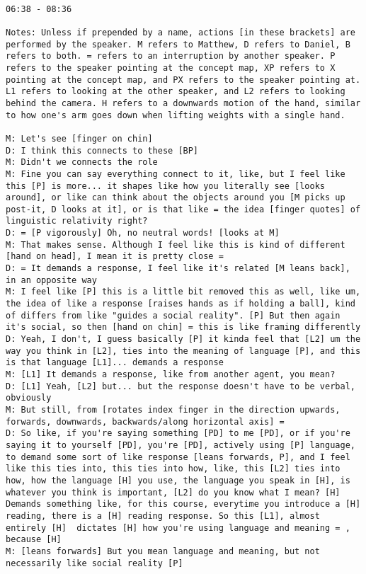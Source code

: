 \documentclass[12pt]{article}
\begin{document}
\begin{lstlisting}

06:38 - 08:36

Notes: Unless if prepended by a name, actions [in these brackets] are performed by the speaker. M refers to Matthew, D refers to Daniel, B refers to both. = refers to an interruption by another speaker. P refers to the speaker pointing at the concept map, XP refers to X pointing at the concept map, and PX refers to the speaker pointing at. L1 refers to looking at the other speaker, and L2 refers to looking behind the camera. H refers to a downwards motion of the hand, similar to how one's arm goes down when lifting weights with a single hand.

M: Let's see [finger on chin]
D: I think this connects to these [BP]
M: Didn't we connects the role
M: Fine you can say everything connect to it, like, but I feel like this [P] is more... it shapes like how you literally see [looks around], or like can think about the objects around you [M picks up post-it, D looks at it], or is that like = the idea [finger quotes] of linguistic relativity right?
D: = [P vigorously] Oh, no neutral words! [looks at M]
M: That makes sense. Although I feel like this is kind of different [hand on head], I mean it is pretty close =
D: = It demands a response, I feel like it's related [M leans back], in an opposite way
M: I feel like [P] this is a little bit removed this as well, like um, the idea of like a response [raises hands as if holding a ball], kind of differs from like "guides a social reality". [P] But then again it's social, so then [hand on chin] = this is like framing differently
D: Yeah, I don't, I guess basically [P] it kinda feel that [L2] um the way you think in [L2], ties into the meaning of language [P], and this is that language [L1]... demands a response
M: [L1] It demands a response, like from another agent, you mean?
D: [L1] Yeah, [L2] but... but the response doesn't have to be verbal, obviously
M: But still, from [rotates index finger in the direction upwards, forwards, downwards, backwards/along horizontal axis] =
D: So like, if you're saying something [PD] to me [PD], or if you're saying it to yourself [PD], you're [PD], actively using [P] language, to demand some sort of like response [leans forwards, P], and I feel like this ties into, this ties into how, like, this [L2] ties into how, how the language [H] you use, the language you speak in [H], is whatever you think is important, [L2] do you know what I mean? [H] Demands something like, for this course, everytime you introduce a [H] reading, there is a [H] reading response. So this [L1], almost entirely [H]  dictates [H] how you're using language and meaning = , because [H]
M: [leans forwards] But you mean language and meaning, but not necessarily like social reality [P]

\end{lstlisting}
\end{document}
